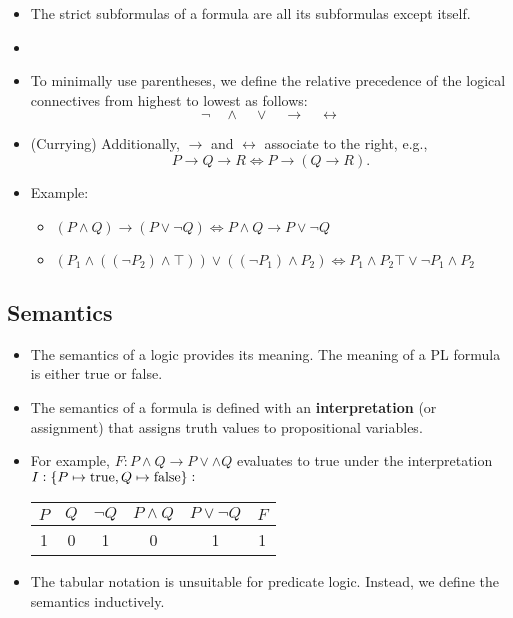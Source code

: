 \begin{itemize}
	\item The strict subformulas of a formula are all its subformulas except itself.
	\item[]
	\item To minimally use parentheses, we define the relative precedence of the logical connectives from highest to lowest as follows: \[
	\lnot\quad\land\quad\lor\quad\rightarrow\quad\leftrightarrow
	\]
	\item (Currying) Additionally, $\rightarrow$ and $\leftrightarrow$ associate to the right, e.g., \[
	P\to Q\to R\iff P\to(Q\to R).
	\]
	\item Example:
	\begin{itemize}
		\item $(P\land Q)\to (P\lor\lnot Q)\iff P\land Q\to P\lor \lnot Q$
		\item $(P_1\land((\lnot P_2)\land\top))\lor((\lnot P_1)\land P_2)\iff P_1\land P_2\top\lor\lnot P_1\land P_2$
	\end{itemize}
\end{itemize}

\subsection{Semantics}
\begin{itemize}
	\item The semantics of a logic provides its meaning. The meaning of a PL formula is either true or false.
	\item The semantics of a formula is defined with an \textbf{interpretation} (or assignment) that assigns truth values to propositional variables.
	\item For example, $F:P\land Q\to P\lor\land Q$ evaluates to true under the interpretation $I:\set{P\mapsto \text{true},Q\mapsto\text{false}}:$
	\begin{table}[h!]\centering{}
		\begin{tabular}{c|c||c|c|c|c}
			\hline
			$P$ & $Q$ & $\lnot Q$ & $P\land Q$ & $P\lor \lnot Q$ & $F$ \\ \hline
			1 & 0 & 1 & 0 & 1 & 1 \\ \hline
		\end{tabular}
	\end{table}
	\item The tabular notation is unsuitable for predicate logic. Instead, we define the semantics inductively.
\end{itemize}

